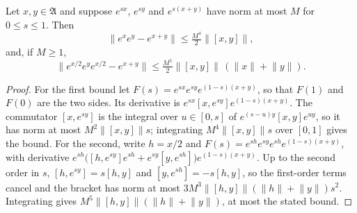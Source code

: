 \begin{lemma}
    \label{lem:product_formula_two}
    \leanok
    Let $x,y\in\mathfrak A$ and suppose $e^{sx}$, $e^{sy}$ and $e^{s(x+y)}$ have
    norm at most $M$ for $0\leq s\leq1$. Then
    \[
        \lVert e^xe^y-e^{x+y}\rVert\leq\tfrac{M^4}{2}\lVert[x,y]\rVert,
    \]
    and, if $M\geq1$,
    \[
        \lVert e^{x/2}e^ye^{x/2}-e^{x+y}\rVert\leq
        \tfrac{M^5}{2}\lVert[x,y]\rVert\,(\lVert x\rVert+\lVert y\rVert).
    \]
\end{lemma}
\begin{proof}\leanok
    For the first bound let $F(s)=e^{sx}e^{sy}e^{(1-s)(x+y)}$, so that $F(1)$
    and $F(0)$ are the two sides. Its derivative is
    $e^{sx}[x,e^{sy}]e^{(1-s)(x+y)}$. The commutator $[x,e^{sy}]$ is the integral
    over $u\in[0,s]$ of $e^{(s-u)y}[x,y]e^{uy}$, so it has norm at most
    $M^2\lVert[x,y]\rVert s$; integrating $M^4\lVert[x,y]\rVert s$ over $[0,1]$
    gives the bound. For the second, write $h=x/2$ and
    $F(s)=e^{sh}e^{sy}e^{sh}e^{(1-s)(x+y)}$, with derivative
    $e^{sh}\bigl([h,e^{sy}]e^{sh}+e^{sy}[y,e^{sh}]\bigr)e^{(1-s)(x+y)}$. Up to
    the second order in $s$, $[h,e^{sy}]=s[h,y]$ and $[y,e^{sh}]=-s[h,y]$, so the
    first-order terms cancel and the bracket has norm at most
    $3M^3\lVert[h,y]\rVert(\lVert h\rVert+\lVert y\rVert)s^2$. Integrating
    gives $M^5\lVert[h,y]\rVert(\lVert h\rVert+\lVert y\rVert)$, at most the
    stated bound.
\end{proof}

